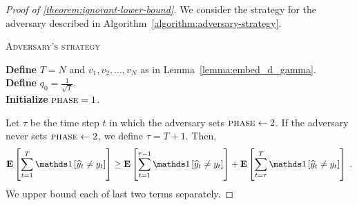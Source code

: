 \begin{proof}[Proof of \autoref{theorem:ignorant-lower-bound}]
We consider the strategy for the adversary described in
Algorithm~\ref{algorithm:adversary-strategy}.

\begin{algorithm}
\caption{\textsc{Adversary's strategy}}
\label{algorithm:adversary-strategy}
\textbf{Define} $T=N$ and $v_1, v_2, \dots, v_N$ as in Lemma~\ref{lemma:embed_d_gamma}.\\
\textbf{Define} $q_0=\frac{1}{\sqrt{T}}$. \\
\textbf{Initialize} $\textsc{phase}= 1$. \\
\end{algorithm}

Let $\tau$ be the time step $t$ in which the adversary sets $\textsc{phase}\leftarrow 2$.
If the adversary never sets $\textsc{phase}\leftarrow 2$, we define $\tau = T + 1$.
Then,
\begin{align*}
 \Exp \left[\sum_{t=1}^T \indicator{\widehat y_t\neq y_t}\right]
 \ge \Exp\left[\sum_{t=1}^{\tau - 1} \indicator{\widehat y_t\neq y_t}\right]
+ \Exp\left[\sum_{t=\tau}^T \indicator{\widehat y_t\neq y_t}\right] \; .
\end{align*}
We upper bound each of last two terms separately.


\end{proof}
